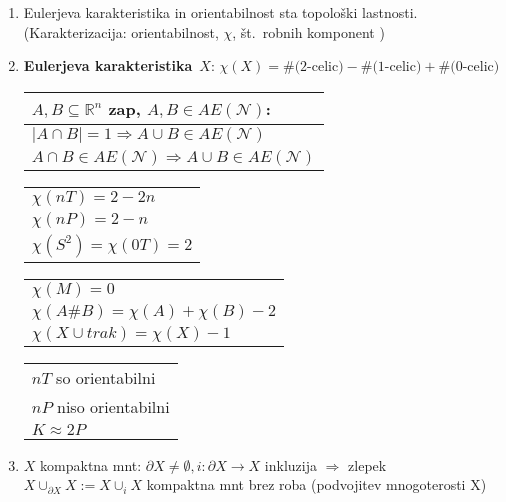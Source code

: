 \documentclass[10pt,a4paper]{article}
\begin{document}
\begin{enumerate}
\item Eulerjeva karakteristika in orientabilnost sta topološki lastnosti. (Karakterizacija: orientabilnost, 
$\chi$, 
št.~robnih komponent )
    
\item \textbf{Eulerjeva karakteristika}~$X$: $\chi(X) = \text{\#($2$-celic)} - \text{\#($1$-celic)} + \text{\#($0$-celic)}$


\vspace{1mm}
    \begin{tabular}{l}
        $A, B \subseteq\mathbb{R}^n$ zap, $A, B \in AE(\mathcal{N})$: \\ \hline
        $|A \cap B| = 1 \Rightarrow A \cup B \in AE(\mathcal{N})$ \\
        $A \cap B \in AE(\mathcal{N})\Rightarrow A \cup B \in AE(\mathcal{N})$ 
    \end{tabular}
    \begin{tabular}{|l|}
        \hline
        $\chi(nT) = 2 - 2n$ \\
        $\chi(nP) = 2 - n$ \\
        $\chi(S^2) = \chi(0T) = 2$ \\
        \hline
    \end{tabular}
    \begin{tabular}{|l|}
        \hline
        $\chi(M) = 0$ \\
        $\chi(A \# B) = \chi(A) + \chi(B) - 2$ \\
        $\chi(X \cup trak) = \chi(X) - 1$ \\
        \hline
    \end{tabular}
    \begin{tabular}{l}
        $nT$ so orientabilni \\
        $nP$ niso orientabilni \\
        $K \approx 2P$
    \end{tabular}
    

\item $X$ kompaktna mnt: $\partial X \neq \emptyset, i: \partial X \rightarrow X$ inkluzija $\Rightarrow$ zlepek $X \cup_{\partial X} X := X \cup _i X$ kompaktna mnt brez roba (podvojitev mnogoterosti X)



\end{enumerate}
\end{document}
